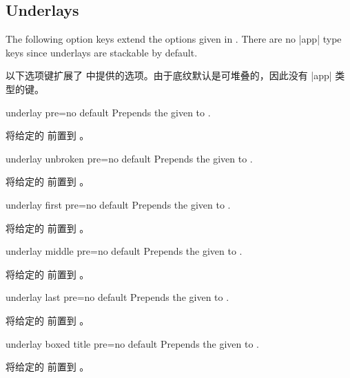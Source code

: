 

\subsection{Underlays}
The following option keys extend the options given in .
There are no |app| type keys since underlays are stackable by default.

以下选项键扩展了  中提供的选项。由于底纹默认是可堆叠的，因此没有 |app| 类型的键。
\begin{docTcbKey}{underlay pre}{=}{no default}
Prepends the given  to .

将给定的  前置到 。
\end{docTcbKey}

\begin{docTcbKey}{underlay unbroken pre}{=}{no default}
Prepends the given  to .

将给定的  前置到 。
\end{docTcbKey}

\begin{docTcbKey}{underlay first pre}{=}{no default}
Prepends the given  to .

将给定的  前置到 。
\end{docTcbKey}

\begin{docTcbKey}{underlay middle pre}{=}{no default}
Prepends the given  to .

将给定的  前置到 。
\end{docTcbKey}

\begin{docTcbKey}{underlay last pre}{=}{no default}
Prepends the given  to .

将给定的  前置到 。
\end{docTcbKey}

\begin{docTcbKey}{underlay boxed title pre}{=}{no default}
Prepends the given  to .

将给定的  前置到 。
\end{docTcbKey}

